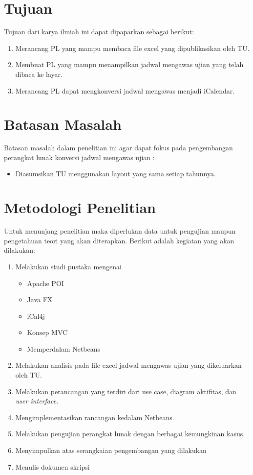 \section{Tujuan}
\label{sec:tujuan}
Tujuan dari karya ilmiah ini dapat dipaparkan sebagai berikut:
\begin{enumerate}
	\item Merancang PL yang mampu membaca file excel yang dipublikasikan oleh TU.
	\item Membuat PL yang mampu menampilkan jadwal mengawas ujian yang telah dibaca ke layar.
	\item Merancang PL dapat mengkonversi jadwal mengawas menjadi iCalendar.
	
\end{enumerate}

\section{Batasan Masalah}
\label{sec:batasan_masalah}
Batasan masalah dalam penelitian ini agar dapat fokus pada pengembangan perangkat lunak konversi jadwal mengawas ujian :
\begin{itemize}
	\item Diasumsikan TU menggunakan layout yang sama setiap tahunnya.  
\end{itemize}

\section{Metodologi Penelitian}
\label{sec:metodologi_penelitian}
Untuk menunjang penelitian maka diperlukan data untuk pengujian maupun pengetahuan teori yang akan diterapkan. Berikut adalah kegiatan yang akan dilakukan:
\begin{enumerate}
		\item Melakukan studi pustaka mengenai
			\begin{itemize}
				\item Apache POI
				\item Java FX
				\item iCal4j
				\item Konsep MVC
				\item Memperdalam Netbeans
			\end{itemize}
		\item Melakukan analisis pada file excel jadwal mengawas ujian yang dikeluarkan oleh TU.
		\item Melakukan perancangan yang terdiri dari use case, diagram aktifitas, dan \textit{user interface}.
		\item Mengimplementasikan rancangan kedalam Netbeans. 
		\item Melakukan pengujian perangkat lunak dengan berbagai kemungkinan kasus.
		\item Menyimpulkan atas serangkaian pengembangan yang dilakukan
		\item Menulis dokumen skripsi
	\end{enumerate}

